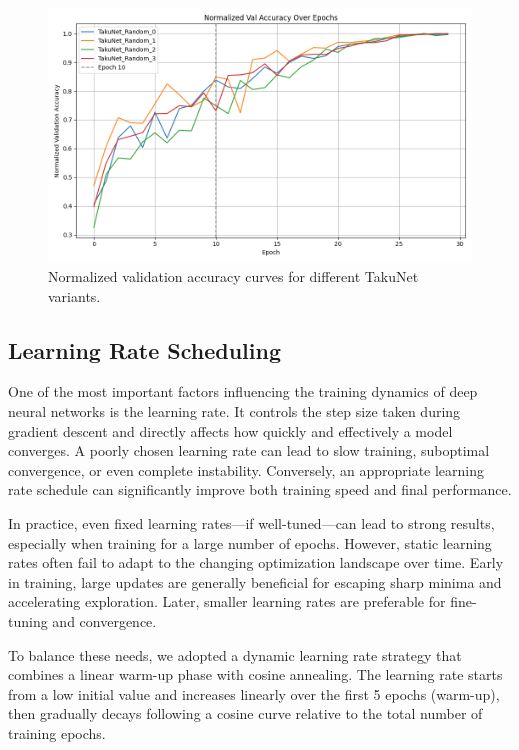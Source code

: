 \begin{figure}[H]
    \centering
    \includegraphics[width=0.85\linewidth]{Pictures/val_accuracy_comparison.png}
    \caption{Normalized validation accuracy curves for different TakuNet variants.}
    \label{fig:val_accuracy}
\end{figure}




\subsection{Learning Rate Scheduling}

One of the most important factors influencing the training dynamics of deep neural networks is the learning rate. It controls the step size taken during gradient descent and directly affects how quickly and effectively a model converges. A poorly chosen learning rate can lead to slow training, suboptimal convergence, or even complete instability. Conversely, an appropriate learning rate schedule can significantly improve both training speed and final performance.

In practice, even fixed learning rates—if well-tuned—can lead to strong results, especially when training for a large number of epochs. However, static learning rates often fail to adapt to the changing optimization landscape over time. Early in training, large updates are generally beneficial for escaping sharp minima and accelerating exploration. Later, smaller learning rates are preferable for fine-tuning and convergence.

To balance these needs, we adopted a dynamic learning rate strategy that combines a linear warm-up phase with cosine annealing. The learning rate starts from a low initial value and increases linearly over the first 5 epochs (warm-up), then gradually decays following a cosine curve relative to the total number of training epochs.

